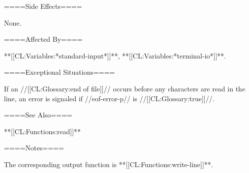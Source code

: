 ====Side Effects====

None.

====Affected By====

**[[CL:Variables:*standard-input*]]**, **[[CL:Variables:*terminal-io*]]**.

====Exceptional Situations====

If an //[[CL:Glossary:end of file]]// occurs before any characters are read in the line, an error is signaled if //eof-error-p// is //[[CL:Glossary:true]]//.

====See Also====

**[[CL:Functions:read]]**

====Notes====

The corresponding output function is **[[CL:Functions:write-line]]**.

